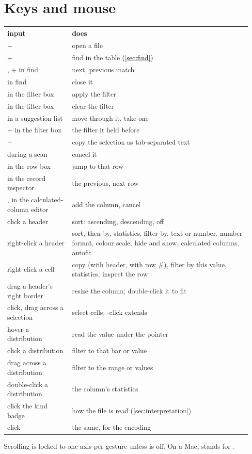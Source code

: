 \chapter{Keys and mouse}\label{app:keys}

\begin{center}\small
\begin{tabularx}{\linewidth}{@{}lL@{}}
\toprule
\sffamily\bfseries input & \sffamily\bfseries does \\
\midrule
{}+ & open a file \\
+ & find in the table (\cref{sec:find}) \\
, + in find & next, previous match \\
 in find & close it \\
 in the filter box & apply the filter \\
 in the filter box & clear the filter \\
   in a suggestion list & move through it, take one \\
+ in the filter box & the filter it held before \\
+ & copy the selection as tab-separated text \\
 during a scan & cancel it \\
 in the row box & jump to that row \\
  in the record inspector & the previous, next row \\
,  in the calculated-column editor & add the column, cancel \\
\midrule
click a header & sort: ascending, descending, off \\
right-click a header & sort, then-by, statistics, filter by, text or number, number format, colour scale,
hide and show, calculated columns, autofit \\
right-click a cell & copy (with header, with row \#), filter by this value, statistics, inspect the row \\
drag a header's right border & resize the column; double-click it to fit \\
click, drag across a selection & select cells; -click extends \\
hover a distribution & read the value under the pointer \\
click a distribution & filter to that bar or value \\
drag across a distribution & filter to the range or values \\
double-click a distribution & the column's statistics \\
click the kind badge & how the file is read (\cref{sec:interpretation}) \\
click  & the same, for the encoding \\
\bottomrule
\end{tabularx}
\end{center}

Scrolling is locked to one axis per gesture unless  is off. On a Mac,
 stands for .

